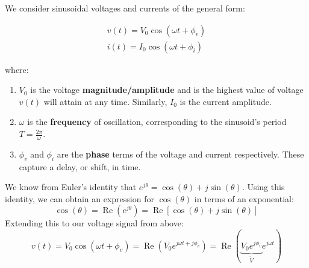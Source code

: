 


We consider sinusoidal voltages and currents of the general form:

\vspace{-15px}
\begin{align*}
v(t) = V_0 \cos(\omega t + \phi_v) \\
i(t) = I_0 \cos(\omega t + \phi_i)
\end{align*}
\vspace{-15px}

\renewcommand{\arraystretch}{1.5}

where:

\begin{enumerate}
\item
    $V_0$ is the voltage \textbf{magnitude/amplitude} and is the highest value of voltage $v(t)$ will attain at any time. Similarly, $I_0$ is the current
    amplitude.
\item
    $\omega$ is the \textbf{frequency} of oscillation, corresponding to the sinusoid's period $T = \frac{2\pi}{\omega}$.
\item
    $\phi_v$ and $\phi_i$ are the \textbf{phase} terms of the voltage and current respectively. These capture a delay, or shift, in time.
\end{enumerate}

We know from Euler's identity that $e^{j\theta}=\cos(\theta)+j\sin(\theta)$. Using this identity, we can obtain an expression for $\cos(\theta)$ in terms of an exponential:
\[\cos(\theta)=\operatorname{Re}(e^{j\theta})=\operatorname{Re}[\cos(\theta)+j\sin(\theta)]\]
Extending this to our voltage signal from above:
\[v(t) = V_0 \cos(\omega t + \phi_v)=\operatorname{Re}(V_0 e^{j\omega t + j\phi_v}) = \operatorname{Re}(\underbrace{V_0 e^{j\phi_v}}_{\widetilde{V}} e^{j\omega t})\]
\vspace{-10px}

